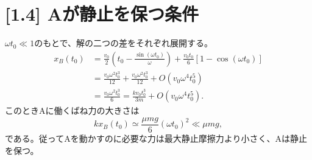 \documentclass[11pt,a4paper]{article}
\begin{document}
\section*{[1.4] Aが静止を保つ条件}
$\omega t_0\ll1$のもとで、解の二つの差をそれぞれ展開する。
\begin{align}
  x_B(t_0)
  &=\frac{v_0}{2}\left(t_0-\frac{\sin(\omega t_0)}{\omega}\right)
    +\frac{v_0t_0}{6}\left[1-\cos(\omega t_0)\right]\\
  &=\frac{v_0\omega^2t_0^3}{12}
    +\frac{v_0\omega^2t_0^3}{12}
    +O(v_0\omega^4t_0^5)\\
  &=\boxed{\frac{v_0\omega^2t_0^3}{6}
    =\frac{k v_0t_0^3}{3m}}+O(v_0\omega^4t_0^5).
\end{align}
このときAに働くばね力の大きさは
\begin{equation}
  kx_B(t_0)\simeq\frac{\mu mg}{6}(\omega t_0)^2\ll\mu mg,
\end{equation}
である。従ってAを動かすのに必要な力は最大静止摩擦力より小さく、Aは静止を保つ。
\end{document}
